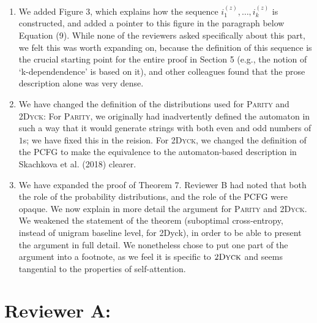 \documentclass[11pt,a4paper]{article}
\newcounter{theorem}
\newcommand\response[1]{{\color{blue}#1}}
\begin{document}
\begin{enumerate}
    \item \response{We added Figure 3, which explains how the sequence $i^{(z)}_1, \dots, i^{(z)}_k$ is constructed, and added a pointer to this figure in the paragraph below Equation (9). While none of the reviewers asked specifically about this part, we felt this was worth expanding on, because the definition of this sequence is the crucial starting point for the entire proof in Section 5 (e.g., the notion of `k-dependendence' is based on it), and other colleagues found that the prose description alone was very dense.}

\item \response{We have changed the definition of the distributions used for \textsc{Parity} and \textsc{2Dyck}: For \textsc{Parity}, we originally had inadvertently defined the automaton in such a way that it would generate strings with both even and odd numbers of $1$s; we have fixed this in the reision. For \textsc{2Dyck}, we changed the definition of the PCFG to make the equivalence to the automaton-based description in Skachkova et al. (2018) clearer.}

\item \response{We have expanded the proof of Theorem 7. Reviewer B had noted that both the role of the probability distributions, and the role of the PCFG were opaque. We now explain in more detail the argument for \textsc{Parity} and \textsc{2Dyck}. We weakened the statement of the theorem (suboptimal cross-entropy, instead of unigram baseline level, for 2Dyck), in order to be able to present the argument in full detail. We nonetheless chose to put one part of the argument into a footnote, as we feel it is specific to $2\textsc{Dyck}$ and seems tangential to the properties of self-attention.}
\end{enumerate}


\section{Reviewer A:}
\end{document}
